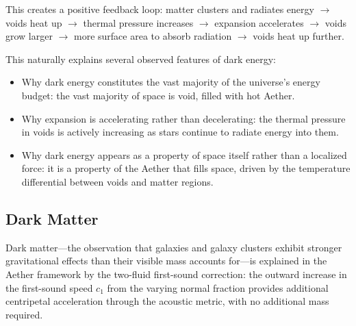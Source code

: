 ﻿\documentclass[12pt,letterpaper]{article}
\begin{document}
This creates a positive feedback loop: matter clusters and radiates energy $\rightarrow$ voids heat
up $\rightarrow$ thermal pressure increases $\rightarrow$ expansion accelerates $\rightarrow$ voids grow larger $\rightarrow$ more
surface area to absorb radiation $\rightarrow$ voids heat up further.

This naturally explains several observed features of dark energy:

\begin{itemize}[leftmargin=2em]
  \item Why dark energy constitutes the vast majority of the universe's energy budget: the
    vast majority of space is void, filled with hot Aether.

  \item Why expansion is accelerating rather than decelerating: the thermal pressure in voids
    is actively increasing as stars continue to radiate energy into them.

  \item Why dark energy appears as a property of space itself rather than a localized force:
    it is a property of the Aether that fills space, driven by the temperature differential
    between voids and matter regions.
\end{itemize}


\subsection{Dark Matter}
\label{sec:dark-matter}

Dark matter---the observation that galaxies and galaxy clusters exhibit stronger
gravitational effects than their visible mass accounts for---is explained in the
Aether framework by the two-fluid first-sound correction: the outward increase
in the first-sound speed $c_1$ from the varying normal fraction provides
additional centripetal acceleration through the acoustic metric, with no
additional mass required.
\end{document}
